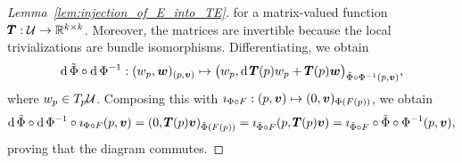 \documentclass[twoside,11pt]{article}
\begin{document}
\begin{proof}[Lemma~\ref{lem:injection_of_E_into_TE}]
    for a matrix-valued function ${\pmb{T}}:{\mathcal{U}} \to \mathbb{R}^{k\times k}$.
    Moreover, the matrices are invertible because the local trivializations are bundle isomorphisms.
    Differentiating, we obtain
    \begin{equation}
        \operatorname{\mathrm{d}} \tilde{\Phi} \circ \operatorname{\mathrm{d}} \Phi^{-1} 
        : (w_p, {\boldsymbol{w}})_{(p, {\boldsymbol{v}})} \mapsto
        \big(w_p, \operatorname{\mathrm{d}} {\pmb{T}}(p) w_p + {\pmb{T}}(p){\boldsymbol{w}}\big)_{\tilde{\Phi} \circ \Phi^{-1}(p,{\boldsymbol{v}})},
    \end{equation}
    where $w_p \in T_p {\mathcal{U}}$.
    Composing this with $\imath_{\Phi \circ F}:(p, {\boldsymbol{v}}) \mapsto (0, {\boldsymbol{v}})_{\Phi(F(p))}$, we obtain
    \begin{equation}
        \operatorname{\mathrm{d}} \tilde{\Phi} \circ \operatorname{\mathrm{d}} \Phi^{-1} \circ \imath_{\Phi \circ F}
        (p, {\boldsymbol{v}})
        = (0, {\pmb{T}}(p){\boldsymbol{v}})_{\tilde{\Phi}(F(p))}
        = \imath_{\tilde{\Phi}\circ F}(p, {\pmb{T}}(p){\boldsymbol{v}})
        = \imath_{\tilde{\Phi}\circ F} \circ \tilde{\Phi} \circ \Phi^{-1}(p, {\boldsymbol{v}}),
    \end{equation}
    proving that the diagram commutes.
\end{proof}
\end{document}
